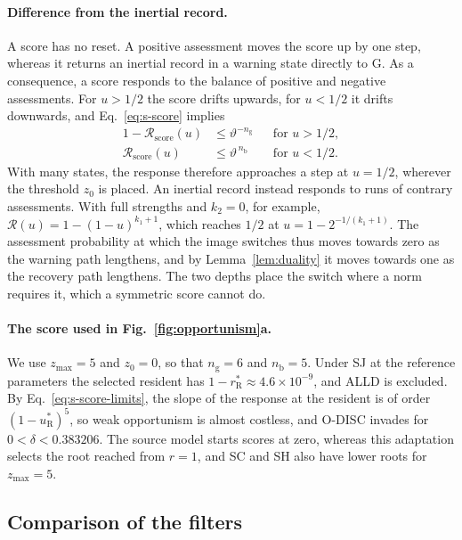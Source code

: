\documentclass[10pt]{wlscirep}
\newcommand{\Rmap}{\mathscr{R}}            %
\newcommand{\rR}{r_{\mathrm{R}}^{*}}
\newcommand{\uR}{u_{\mathrm{R}}^{*}}
\theoremstyle{plain}
\theoremstyle{remark}
\begin{document}
\paragraph{Difference from the inertial record.} A score has no reset. A positive assessment moves the score up by one step, whereas it returns an inertial record in a warning state directly to G. As a consequence, a score responds to the balance of positive and negative assessments. For $u>1/2$ the score drifts upwards, for $u<1/2$ it drifts downwards, and Eq.~\eqref{eq:s-score} implies
\begin{equation}
\begin{aligned}
1-\Rmap_{\mathrm{score}}(u)&\leq \vartheta^{-n_{\mathrm g}} && \text{for } u>1/2,\\
\Rmap_{\mathrm{score}}(u)&\leq \vartheta^{\,n_{\mathrm b}} && \text{for } u<1/2.
\end{aligned}
\label{eq:s-score-step}
\end{equation}
With many states, the response therefore approaches a step at $u=1/2$, wherever the threshold $z_0$ is placed. An inertial record instead responds to runs of contrary assessments. With full strengths and $k_2=0$, for example, $\Rmap(u)=1-(1-u)^{k_1+1}$, which reaches $1/2$ at $u=1-2^{-1/(k_1+1)}$. The assessment probability at which the image switches thus moves towards zero as the warning path lengthens, and by Lemma~\ref{lem:duality} it moves towards one as the recovery path lengthens. The two depths place the switch where a norm requires it, which a symmetric score cannot do.

\paragraph{The score used in Fig.~\ref{fig:opportunism}a.} We use $z_{\max}=5$ and $z_0=0$, so that $n_{\mathrm g}=6$ and $n_{\mathrm b}=5$. Under SJ at the reference parameters the selected resident has $1-\rR\approx4.6\times10^{-9}$, and ALLD is excluded. By Eq.~\eqref{eq:s-score-limits}, the slope of the response at the resident is of order $(1-\uR)^{5}$, so weak opportunism is almost costless, and O-DISC invades for $0<\delta<0.383206$. The source model starts scores at zero, whereas this adaptation selects the root reached from $r=1$, and SC and SH also have lower roots for $z_{\max}=5$.

\subsection{Comparison of the filters}
\end{document}
